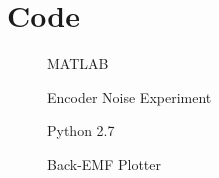 
\cleardoublepage

\chapter{Code}
\label{Appendix:Key4}

\begin{figure}
	\caption{Encoder Noise Experiment}
	\centering
	MATLAB
	
\end{figure}

\begin{figure}
	\caption{Back-EMF Plotter}
	\centering
	Python 2.7
	
\end{figure}